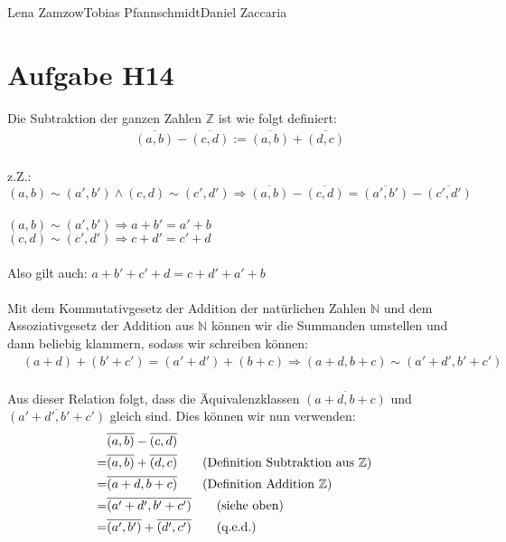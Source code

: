 \documentclass[11pt,a4paper]{article}
\begin{document}
                {Lena Zamzow}{Tobias Pfannschmidt}{Daniel Zaccaria}{}{}


\section*{Aufgabe H14}
Die Subtraktion der ganzen Zahlen $\mathbb{Z}$ ist wie folgt definiert: \\
\begin{align*}
&\overline{(a,b)} - \overline{(c,d)} := \overline{(a,b)} + \overline{(d,c)} \\
\end{align*}


z.Z.: 
$ (a,b) \sim (a',b') \land (c, d) \sim (c',d') \Rightarrow \overline{(a,b)} - \overline{(c,d)} = \overline{(a',b')} - \overline{(c',d')}$ \\
\\
$(a,b) \sim (a',b') \Rightarrow a + b' = a' + b$ \\
$(c,d) \sim (c',d') \Rightarrow c + d' = c' + d$ \\
\\
Also gilt auch: 
$ a + b' + c' + d = c + d' + a' + b$ \\
\\
Mit dem Kommutativgesetz der Addition der natürlichen Zahlen $\mathbb{N}$ und dem Assoziativgesetz der Addition aus $\mathbb{N}$ können wir die Summanden umstellen und dann beliebig klammern, sodass wir schreiben können: \\
\begin{align*}
&(a+d) + (b'+c') = (a'+d') + (b+c) \Rightarrow (a+d, b+c) \sim (a'+d', b'+c') \\
\end{align*}

Aus dieser Relation folgt, dass die Äquivalenzklassen $\overline{(a+d,b+c)}$ und $\overline{(a'+d',b'+c')}$ gleich sind. Dies können wir nun verwenden: \\
\begin{align*}
&\overline{(a,b)} - \overline{(c,d)} \\
=& \overline{(a,b)} + \overline{(d,c)}   \tag{Definition Subtraktion aus $\mathbb{Z}$} \\
=& \overline{(a+d,b+c)}   \tag{Definition Addition $\mathbb{Z}$}\\
=& \overline{(a'+d',b'+c')}   \tag{siehe oben} \\
=& \overline{(a',b')} + \overline{(d',c')}   \tag{q.e.d.}
\end{align*}
\end{document}
